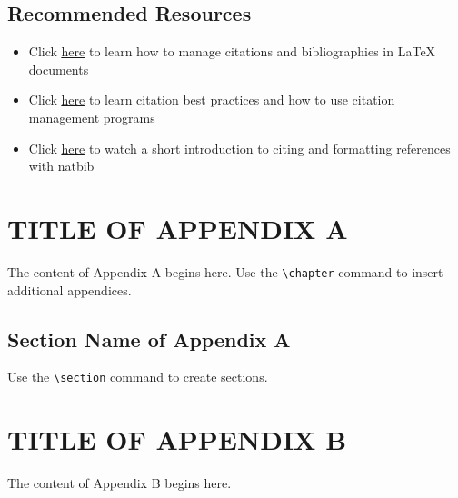 \documentclass[11pt]{report}
\begin{document}
\begin{mainf}
\section{Recommended Resources}
\begin{itemize}
    \item Click \underline{\href{https://guides.library.upenn.edu/LaTeX/cite}{here}} to learn how to manage citations and bibliographies in LaTeX documents
    \item Click \underline{\href{https://www.library.upenn.edu/help-with/tutorials/citation-practices}{here}} to learn citation best practices and how to use citation management programs
    \item Click \underline{\href{https://mediaspace.library.upenn.edu/media/LaTeX+Fundamentals+-+6.2+Citations+\%26+Bibliographies+-+natbib/1_sxrfdv5j}{here}} to watch a short introduction to citing and formatting references with natbib
\end{itemize}

\end{mainf}

\begin{append}
\chapter{\MakeUppercase{Title of Appendix A}}
The content of Appendix A begins here. Use the \verb|\chapter| command to insert additional appendices.
\section{Section Name of Appendix A}
Use the \verb|\section| command to create sections.
\chapter{\MakeUppercase{Title of Appendix B}}
The content of Appendix B begins here.
\end{append}

\begin{bibliof}

\end{bibliof}
\end{document}
